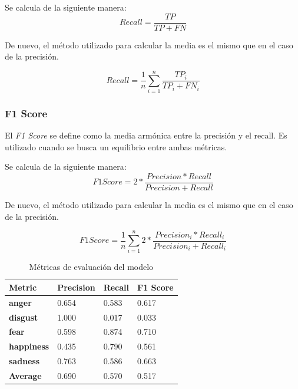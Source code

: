 Se calcula de la siguiente manera:
\begin{equation}
    Recall = \frac{TP}{TP + FN}
\end{equation}

De nuevo, el método utilizado para calcular la media es el mismo que en el caso de la precisión.

\begin{equation}
    Recall = \frac{1}{n} \sum_{i=1}^{n} \frac{TP_i}{TP_i + FN_i}
\end{equation}

\subsubsection{F1 Score}\label{seccion:f1-score}
El \textit{F1 Score} se define como la media armónica entre la precisión y el recall.
Es utilizado cuando se busca un equilibrio entre ambas métricas.

Se calcula de la siguiente manera:
\begin{equation}
    F1 Score = 2 * \frac{Precision * Recall}{Precision + Recall}
\end{equation}

De nuevo, el método utilizado para calcular la media es el mismo que en el caso de la precisión.

\begin{equation}
    F1 Score = \frac{1}{n} \sum_{i=1}^{n} 2 * \frac{Precision_i * Recall_i}{Precision_i + Recall_i}
\end{equation}




\begin{table}[htpb]
    \centering
    \begin{tabular}{|l|l|l|l|}
        \hline
        \textbf{Metric} & \textbf{Precision} & \textbf{Recall} & \textbf{F1 Score} \\ \hline
        \textbf{anger} & 0.654 & 0.583 & 0.617 \\ \hline
        \textbf{disgust} & 1.000 & 0.017 & 0.033 \\ \hline
        \textbf{fear} & 0.598 & 0.874 & 0.710 \\ \hline
        \textbf{happiness} & 0.435 & 0.790 & 0.561 \\ \hline
        \textbf{sadness} & 0.763 & 0.586 & 0.663 \\ \hline
        \textbf{Average} & 0.690 & 0.570 & 0.517 \\ \hline
    \end{tabular}
    \caption{Métricas de evaluación del modelo}
    \label{tab:model-metrics}
\end{table}


